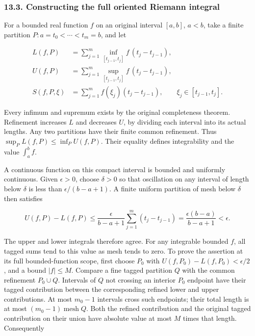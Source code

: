 \documentclass[
  11pt,
]{article}
\begin{document}
\subsubsection{13.3. Constructing the full oriented Riemann
integral}\label{constructing-the-full-oriented-riemann-integral}

For a bounded real function \(f\) on an original interval \([a,b]\),
\(a<b\), take a finite partition \(P:a=t_0<\cdots<t_m=b\), and let

\[
\begin{aligned}
 L(f,P)&=\sum_{j=1}^m
   \inf_{[t_{j-1},t_j]}f\,(t_j-t_{j-1}),\\
 U(f,P)&=\sum_{j=1}^m
   \sup_{[t_{j-1},t_j]}f\,(t_j-t_{j-1}),\\
 S(f,P,\xi)&=\sum_{j=1}^m f(\xi_j)(t_j-t_{j-1}),
 \qquad \xi_j\in[t_{j-1},t_j].
\end{aligned}\tag{OC7}
\]

Every infimum and supremum exists by the original completeness theorem.
Refinement increases \(L\) and decreases \(U\), by dividing each
interval into its actual lengths. Any two partitions have their finite
common refinement. Thus \(\sup_P L(f,P)\le\inf_P U(f,P)\). Their
equality defines integrability and the value \(\int_a^bf\).

A continuous function on this compact interval is bounded and uniformly
continuous. Given \(\epsilon>0\), choose \(\delta>0\) so that
oscillation on any interval of length below \(\delta\) is less than
\(\epsilon/(b-a+1)\). A finite uniform partition of mesh below
\(\delta\) then satisfies

\[
 U(f,P)-L(f,P)
 \le \frac{\epsilon}{b-a+1}\sum_{j=1}^m(t_j-t_{j-1})
 =\frac{\epsilon(b-a)}{b-a+1}<\epsilon.
\tag{OC8}
\]

The upper and lower integrals therefore agree. For any integrable
bounded \(f\), all tagged sums tend to this value as mesh tends to zero.
To prove the assertion at its full bounded-function scope, first choose
\(P_0\) with \(U(f,P_0)-L(f,P_0)<\epsilon/2\), and a bound \(|f|\le M\).
Compare a fine tagged partition \(Q\) with the common refinement
\(P_0\cup Q\). Intervals of \(Q\) not crossing an interior \(P_0\)
endpoint have their tagged contribution between the corresponding
refined lower and upper contributions. At most \(m_0-1\) intervals cross
such endpoints; their total length is at most
\((m_0-1)\operatorname{mesh}Q\). Both the refined contribution and the
original tagged contribution on their union have absolute value at most
\(M\) times that length. Consequently
\end{document}
